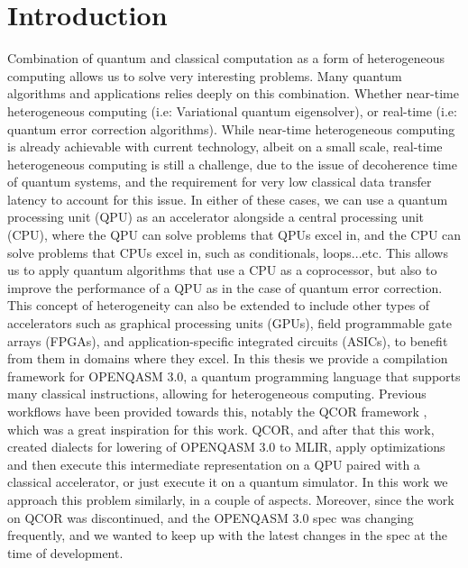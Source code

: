 \chapter{Introduction}
\label{chapter:Introduction}
Combination of quantum and classical computation as a form of heterogeneous computing allows us
to solve very interesting problems. Many quantum algorithms and applications relies
deeply on this combination. Whether near-time heterogeneous computing (i.e: Variational quantum eigensolver),
or real-time (i.e: quantum error correction algorithms). While near-time heterogeneous computing
is already achievable with current technology, albeit on a small scale, 
real-time heterogeneous computing is still a
challenge,
due to the issue of decoherence time of quantum systems, and the requirement for
very low classical data transfer latency to account for this issue. In either
of these cases, we can use a quantum processing unit (QPU) as an accelerator
alongside a central processing unit (CPU), where the QPU can solve problems that QPUs excel in, and the
CPU can solve problems that CPUs excel in, such as conditionals, loops...etc.
This allows us to apply quantum algorithms that use a CPU as a coprocessor,
but also to improve the performance of a QPU as in the case of quantum error
correction.  This concept of heterogeneity can also be extended to include
other types of accelerators such as graphical processing units (GPUs), 
field programmable gate arrays (FPGAs), and application-specific integrated circuits (ASICs), to benefit from them
in domains where they excel. In this thesis we provide a compilation 
framework for OPENQASM 3.0, a quantum programming language that supports many classical instructions,
allowing for heterogeneous computing. Previous workflows have been provided towards this,
notably the QCOR framework \cite{qcor-openqasm}, which was a great inspiration for this work. QCOR, and after that this work,
created dialects for lowering of OPENQASM 3.0 to MLIR, apply optimizations and then
execute this intermediate representation on a QPU paired with a classical accelerator, or just execute it 
on a quantum simulator.
In this work we approach this problem similarly, in a couple of aspects. Moreover, 
since the work on QCOR was discontinued, and the OPENQASM 3.0 spec was changing
frequently, and we wanted to keep up with the latest changes in the spec at the time of development.

